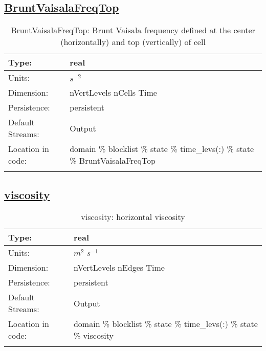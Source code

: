 \subsection[BruntVaisalaFreqTop]{\hyperref[sec:var_tab_state]{BruntVaisalaFreqTop}}
\label{subsec:var_sec_state_BruntVaisalaFreqTop}
\begin{center}
\begin{longtable}{| p{2.0in} | p{4.0in} |}
        \hline 
        Type: & real \\
        \hline 
        Units: & $s^{-2}$ \\
        \hline 
        Dimension: & nVertLevels nCells Time \\
        \hline 
        Persistence: & persistent \\
        \hline 
		 Default Streams: & Output  \\
        \hline 
		 Location in code: & domain \% blocklist \% state \% time\_levs(:) \% state \% BruntVaisalaFreqTop \\
		 \hline 
    \caption{BruntVaisalaFreqTop: Brunt Vaisala frequency defined at the center (horizontally) and top (vertically) of cell}
\end{longtable}
\end{center}
\subsection[viscosity]{\hyperref[sec:var_tab_state]{viscosity}}
\label{subsec:var_sec_state_viscosity}
\begin{center}
\begin{longtable}{| p{2.0in} | p{4.0in} |}
        \hline 
        Type: & real \\
        \hline 
        Units: & $m^2$ $s^{-1}$ \\
        \hline 
        Dimension: & nVertLevels nEdges Time \\
        \hline 
        Persistence: & persistent \\
        \hline 
		 Default Streams: & Output  \\
        \hline 
		 Location in code: & domain \% blocklist \% state \% time\_levs(:) \% state \% viscosity \\
		 \hline 
    \caption{viscosity: horizontal viscosity}
\end{longtable}
\end{center}
